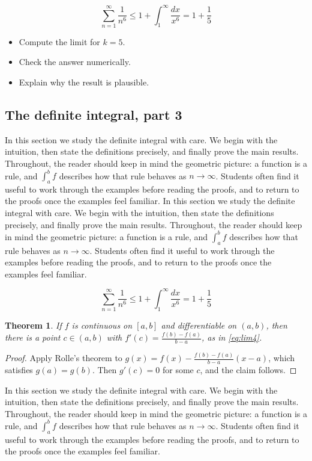 \documentclass[11pt]{article}
\newtheorem{theorem}{Theorem}[section]
\begin{document}
\[
  \sum_{n=1}^{\infty} \frac{1}{n^{6}} \le 1 + \int_1^{\infty} \frac{dx}{x^{6}} = 1 + \frac{1}{5}
\]

\begin{itemize}
  \item Compute the limit for $k = 5$.
  \item Check the answer numerically.
  \item Explain why the result is plausible.
\end{itemize}

\subsection{The definite integral, part 3}

In this section we study the definite integral with care. We begin with the intuition, then state the definitions precisely, and finally prove the main results. Throughout, the reader should keep in mind the geometric picture: a function is a rule, and $\int_a^b f$ describes how that rule behaves as $n \to \infty$. Students often find it useful to work through the examples before reading the proofs, and to return to the proofs once the examples feel familiar. In this section we study the definite integral with care. We begin with the intuition, then state the definitions precisely, and finally prove the main results. Throughout, the reader should keep in mind the geometric picture: a function is a rule, and $\int_a^b f$ describes how that rule behaves as $n \to \infty$. Students often find it useful to work through the examples before reading the proofs, and to return to the proofs once the examples feel familiar. 

\[
  \sum_{n=1}^{\infty} \frac{1}{n^{6}} \le 1 + \int_1^{\infty} \frac{dx}{x^{6}} = 1 + \frac{1}{5}
\]

\begin{theorem}
If $f$ is continuous on $[a,b]$ and differentiable on $(a,b)$, then there is a point $c \in (a,b)$ with $f'(c) = \frac{f(b)-f(a)}{b-a}$, as in \eqref{eq:lim4}.
\end{theorem}

\begin{proof}
Apply Rolle's theorem to $g(x) = f(x) - \frac{f(b)-f(a)}{b-a}(x-a)$, which satisfies $g(a) = g(b)$. Then $g'(c) = 0$ for some $c$, and the claim follows.
\end{proof}

In this section we study the definite integral with care. We begin with the intuition, then state the definitions precisely, and finally prove the main results. Throughout, the reader should keep in mind the geometric picture: a function is a rule, and $\int_a^b f$ describes how that rule behaves as $n \to \infty$. Students often find it useful to work through the examples before reading the proofs, and to return to the proofs once the examples feel familiar. 
\end{document}
